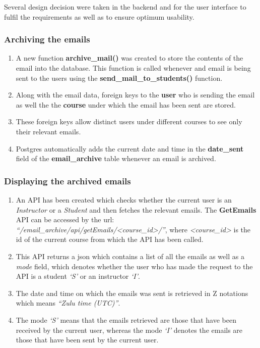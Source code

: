 Several design decision were taken in the backend and for the user interface to fulfil the requirements as well as to ensure optimum usability.

\subsubsection{Archiving the emails}

\begin{enumerate}
	\item A new function \textbf{archive\_mail()} was created to store the contents of the email into the database. This function is called whenever and email is being sent to the users using the \textbf{send\_mail\_to\_students()} function.
	\item Along with the email data, foreign keys to the \textbf{user} who is sending the email as well the the \textbf{course} under which the email has been sent are stored.
	\item These foreign keys allow distinct users under different courses to see only their relevant emails.
	\item Postgres automatically adds the current date and time in the \textbf{date\_sent} field of the \textbf{email\_archive} table whenever an email is archived.
\end{enumerate}


\subsubsection{Displaying the archived emails}

\begin{enumerate}
	\item An API has been created which checks whether the current user is an \textit{Instructor} or a \textit{Student} and then fetches the relevant emails. The \textbf{GetEmails} API can be accessed by the url:
	\textit{``/email\_archive/api/getEmails/\textless course\_id\textgreater/''}, where \textit{\textless course\_id\textgreater} is the id of the current course from which the API has been called.
	\item This API returns a json which contains a list of all the emails as well as a \textit{mode} field, which denotes whether the user who has made the request to the API is a student \textit{`S'} or an instructor \textit{`I'}.
	\item The date and time on which the emails was sent is retrieved in Z notations which means \textit{``Zulu time (UTC)''}.
	\item The mode \textit{`S'} means that the emails retrieved are those that have been received by the current user, whereas the mode \textit{`I'} denotes the emails are those that have been sent by the current user.
\end{enumerate}

